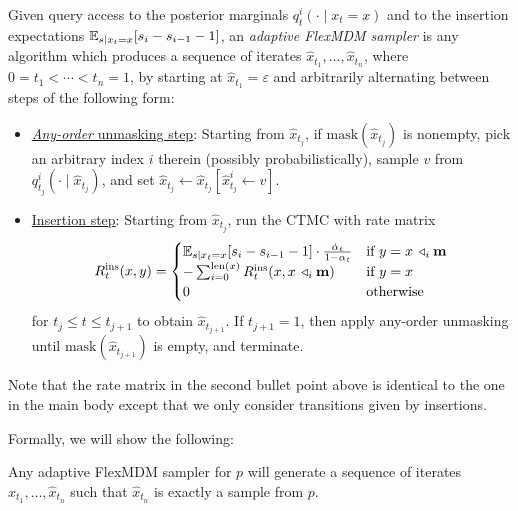 \begin{appdefinition}\label{def:adaptive}
    Given query access to the posterior marginals $q^i_t(\cdot \mid x_t = x)$ and to the insertion expectations $\mathbb{E}_{s\mid x_t = x}[s_i - s_{i-1} -1]$, an \emph{adaptive FlexMDM sampler} is any algorithm which produces a sequence of iterates $\hat{x}_{t_1},\ldots,\hat{x}_{t_n}$, where $0 = t_1 < \cdots < t_n = 1$, by starting at $\hat{x}_{t_1} = \varepsilon$ and arbitrarily alternating between steps of the following form:
    \begin{itemize}[leftmargin=*]
        \item \underline{\emph{Any-order} unmasking step}: Starting from $\hat{x}_{t_j}$, if $\mathrm{mask}(\hat{x}_{t_j})$ is nonempty, pick an arbitrary index $i$ therein (possibly probabilistically), sample $v$ from $q^i_{t_j}(\cdot \mid  \hat{x}_{t_j})$, and set $\hat{x}_{t_j} \gets \hat{x}_{t_j}[\hat{x}_{t_j}^i \gets v]$.
        \item \underline{Insertion step}: Starting from $\hat{x}_{t_j}$, run the CTMC with rate matrix
        \begin{equation}
            R^{\rm ins}_t(x,y) = \begin{cases} \mathbb{E}_{s\mid x_t = x}[s_i - s_{i-1} - 1]\cdot \frac{\dot{\alpha}_t}{1 - \alpha_t} & \text{if} \ y = x\,\triangleleft_{i}\mathbf{m} \\
            -\sum^{\mathrm{len}(x)}_{i=0} R^{\rm ins}_t(x,x\,\triangleleft_{i}\mathbf{m}) & \text{if} \ y = x \\
            0 & \text{otherwise}
            \end{cases} \label{eq:insrate}
        \end{equation} for $t_j \le t \le t_{j+1}$ to obtain $\hat{x}_{t_{j+1}}$. If $t_{j+1} = 1$, then apply any-order unmasking until $\mathrm{mask}(\hat{x}_{t_{j+1}})$ is empty, and terminate.
    \end{itemize}
\end{appdefinition}

Note that the rate matrix in the second bullet point above is identical to the one in the main body except that we only consider transitions given by insertions.

Formally, we will show the following:

\begin{appthm}\label{thm:anyorder}
    Any adaptive FlexMDM sampler for $p$ will generate a sequence of iterates $\hat{x}_{t_1},\ldots,\hat{x}_{t_n}$ such that $\hat{x}_{t_n}$ is exactly a sample from $p$.
\end{appthm}

